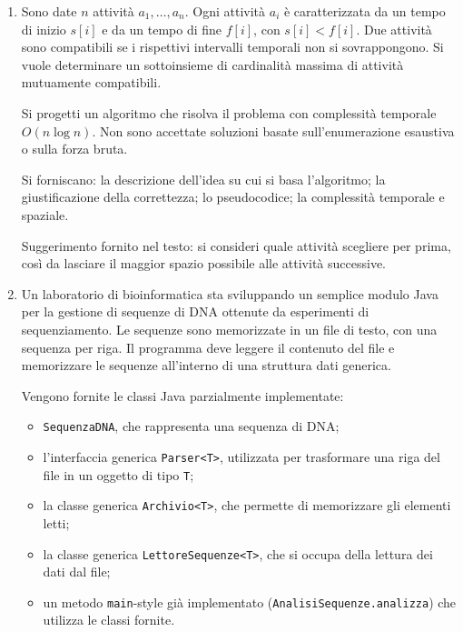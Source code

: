 	\begin{enumerate}
		\item Sono date $n$ attività $a_1,\dots,a_n$. Ogni attività $a_i$ è caratterizzata da un tempo di inizio $s[i]$ e da un tempo di fine $f[i]$, con $s[i]<f[i]$. Due attività sono compatibili se i rispettivi intervalli temporali non si sovrappongono. Si vuole determinare un sottoinsieme di cardinalità massima di attività mutuamente compatibili.
		
		Si progetti un algoritmo che risolva il problema con complessità temporale $O(n\log n)$. Non sono accettate soluzioni basate sull'enumerazione esaustiva o sulla forza bruta.
		
		Si forniscano: la descrizione dell'idea su cui si basa l'algoritmo; la giustificazione della correttezza; lo pseudocodice; la complessità temporale e spaziale.
		
		Suggerimento fornito nel testo: si consideri quale attività scegliere per prima, così da lasciare il maggior spazio possibile alle attività successive.
		
		\item Un laboratorio di bioinformatica sta sviluppando un semplice modulo Java per la gestione di sequenze di DNA ottenute da esperimenti di sequenziamento. Le sequenze sono memorizzate in un file di testo, con una sequenza per riga. Il programma deve leggere il contenuto del file e memorizzare le sequenze all'interno di una struttura dati generica.
		
		Vengono fornite le classi Java parzialmente implementate:
		\begin{itemize}
			\item \texttt{SequenzaDNA}, che rappresenta una sequenza di DNA;
			\item l'interfaccia generica \texttt{Parser<T>}, utilizzata per trasformare una riga del file in un oggetto di tipo \texttt{T};
			\item la classe generica \texttt{Archivio<T>}, che permette di memorizzare gli elementi letti;
			\item la classe generica \texttt{LettoreSequenze<T>}, che si occupa della lettura dei dati dal file;
			\item un metodo \texttt{main}-style già implementato (\texttt{AnalisiSequenze.analizza}) che utilizza le classi fornite.
		\end{itemize}
		

\end{enumerate}
